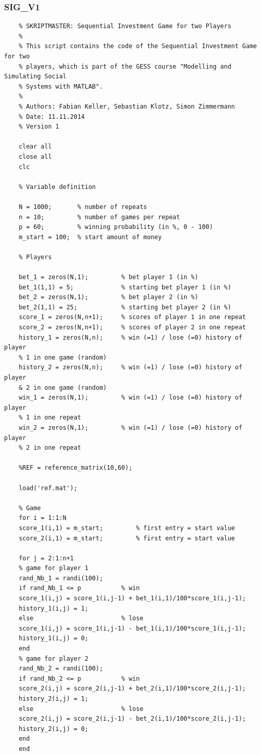 \documentclass[11pt]{article}
\begin{document}
\subsubsection{SIG\_V1}
\begin{lstlisting}
	% SKRIPTMASTER: Sequential Investment Game for two Players
	%
	% This script contains the code of the Sequential Investment Game for two
	% players, which is part of the GESS course "Modelling and Simulating Social
	% Systems with MATLAB".
	%
	% Authors: Fabian Keller, Sebastian Klotz, Simon Zimmermann
	% Date: 11.11.2014
	% Version 1
	
	clear all
	close all
	clc
	
	% Variable definition
	
	N = 1000;       % number of repeats
	n = 10;         % number of games per repeat
	p = 60;         % winning probability (in %, 0 - 100)
	m_start = 100;  % start amount of money
	
	% Players
	
	bet_1 = zeros(N,1);         % bet player 1 (in %)
	bet_1(1,1) = 5;             % starting bet player 1 (in %)
	bet_2 = zeros(N,1);         % bet player 2 (in %)
	bet_2(1,1) = 25;            % starting bet player 2 (in %)
	score_1 = zeros(N,n+1);     % scores of player 1 in one repeat
	score_2 = zeros(N,n+1);     % scores of player 2 in one repeat
	history_1 = zeros(N,n);     % win (=1) / lose (=0) history of player 
	% 1 in one game (random)
	history_2 = zeros(N,n);     % win (=1) / lose (=0) history of player 
	& 2 in one game (random)    
	win_1 = zeros(N,1);         % win (=1) / lose (=0) history of player 
	% 1 in one repeat   
	win_2 = zeros(N,1);         % win (=1) / lose (=0) history of player 
	% 2 in one repeat
	
	%REF = reference_matrix(10,60);
	
	load('ref.mat');
	
	% Game
	for i = 1:1:N
	score_1(i,1) = m_start;         % first entry = start value
	score_2(i,1) = m_start;         % first entry = start value
	
	for j = 2:1:n+1
	% game for player 1
	rand_Nb_1 = randi(100);
	if rand_Nb_1 <= p           % win
	score_1(i,j) = score_1(i,j-1) + bet_1(i,1)/100*score_1(i,j-1);
	history_1(i,j) = 1;
	else                        % lose
	score_1(i,j) = score_1(i,j-1) - bet_1(i,1)/100*score_1(i,j-1);
	history_1(i,j) = 0;  
	end
	% game for player 2
	rand_Nb_2 = randi(100);
	if rand_Nb_2 <= p           % win
	score_2(i,j) = score_2(i,j-1) + bet_2(i,1)/100*score_2(i,j-1);
	history_2(i,j) = 1;
	else                        % lose
	score_2(i,j) = score_2(i,j-1) - bet_2(i,1)/100*score_2(i,j-1);
	history_2(i,j) = 0;
	end
	end
	

\end{lstlisting}
\end{document}
